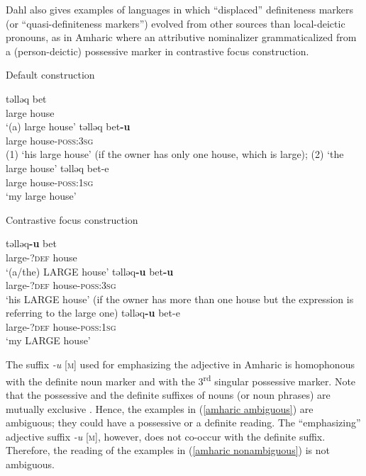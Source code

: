 {
Dahl also gives examples of languages in which “displaced” definiteness markers (or “quasi-definiteness markers”) evolved from other sources than local-deictic pronouns, as in Amharic where an attributive nominalizer grammaticalized from a (person-deictic) possessive marker in contrastive focus construction.
\begin{exe}
\ex	{}
\begin{xlist}
\ex	\rm{Default construction}
\begin{xlist}
\ex
\gll	təlləq bet\\
	large	house\\								
\glt	‘(a) large house’
\ex	\label{amharic ambiguous}
\gll	təlləq bet\textbf{-u}\\
	large house-\textsc{poss:3sg}\\
\glt	(1) ‘his large house’ (if the owner has only one house, which is large); (2) ‘the large house’
\ex
\gll	təlləq bet-e\\
	large house-\textsc{poss:1sg}\\
\glt	‘my large house’
\end{xlist}
\ex	\rm{Contrastive focus construction}
\begin{xlist}
\ex	
\gll	təlləq\textbf{-u} bet\\
	large-\textsc{?def} house\\
\glt	‘(a/the) LARGE house’
\ex	\label{amharic nonambiguous}
\gll	təlləq\textbf{-u} bet\textbf{-u}\\
	large-\textsc{?def} house-\textsc{poss:3sg}\\
\glt	‘his LARGE house’ (if the owner has more than one house but the expression is referring to the large one)
\ex
\gll	təlləq\textbf{-u} bet-e\\
	large-\textsc{?def} house-\textsc{poss:1sg}\\
\glt	‘my LARGE house’
\end{xlist}
\end{xlist}
\end{exe}
The suffix \textit{-u} [\textsc{m}] used for emphasizing the adjective in Amharic is homophonous with the definite noun marker and with the 3\textsuperscript{rd} singular possessive marker. Note that the possessive and the definite suffixes of nouns (or noun phrases) are mutually exclusive \citep[463]{hudson1997}. Hence, the examples in (\ref{amharic ambiguous}) are ambiguous; they could have a possessive or a definite reading. The “emphasizing” adjective suffix \textit{-u} [\textsc{m}], however, does not co-occur with the definite suffix. Therefore, the reading of the examples in (\ref{amharic nonambiguous}) is not ambiguous.

}
